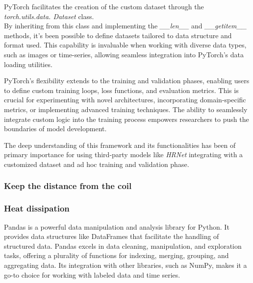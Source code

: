 PyTorch facilitates the creation of the custom dataset through the \textit{torch.utils.data. Dataset} class.\\ 
By inheriting from this class and implementing the \textit{\_\_len\_\_} and \textit{\_\_getitem\_\_} methods, it's been possible to define datasets tailored to data structure and format used. This capability is invaluable when working with diverse data types, such as images or time-series, allowing seamless integration into PyTorch's data loading utilities.

PyTorch's flexibility extends to the training and validation phases, enabling users to define custom training loops, loss functions, and evaluation metrics. This is crucial for experimenting with novel architectures, incorporating domain-specific metrics, or implementing advanced training techniques. The ability to seamlessly integrate custom logic into the training process empowers researchers to push the boundaries of model development.

The deep understanding of this framework and its functionalities has been of primary importance for using third-party models like \textit{HRNet}\cite{sun2019deep} integrating with a customized dataset and ad hoc training and validation phase.

\subsubsection{Keep the distance from the coil}

\subsubsection{Heat dissipation}



Pandas is a powerful data manipulation and analysis library for Python. It provides data structures like DataFrames that facilitate the handling of structured data. Pandas excels in data cleaning, manipulation, and exploration tasks, offering a plurality of functions for indexing, merging, grouping, and aggregating data. Its integration with other libraries, such as NumPy, makes it a go-to choice for working with labeled data and time series.

